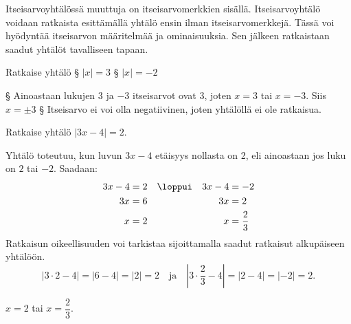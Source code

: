 
Itseisarvoyhtälössä muuttuja on itseisarvomerkkien sisällä. Itseisarvoyhtälö voidaan ratkaista esittämällä yhtälö ensin ilman itseisarvomerkkejä. Tässä voi hyödyntää itseisarvon määritelmää ja ominaisuuksia. Sen jälkeen ratkaistaan saadut yhtälöt tavalliseen tapaan.


\begin{esimerkki}
	Ratkaise yhtälö
	\alakohdat
		§  $|x|=3$
		§  $|x|=-2$
	\loppu
	\begin{esimratk}
		\alakohdat
			§ Ainoastaan lukujen $3$ ja $-3$ itseisarvot ovat 3, joten $x=3$ tai $x=-3$. Siis $x=\pm 3$
			§ Itseisarvo ei voi olla negatiivinen, joten yhtälöllä ei ole ratkaisua.
		\loppu
	\end{esimratk}
\end{esimerkki}

\begin{esimerkki}
	Ratkaise yhtälö $|3x-4|=2$.
	\begin{esimratk}
		Yhtälö toteutuu, kun luvun $3x-4$ etäisyys nollasta on 2, eli ainoastaan jos luku on $2$ tai $-2$. Saadaan:
		\begin{align*}
			3x-4 & =2 & & \loppui & 3x-4 & =-2 \\
			3x & =6 && & 3x & = 2 \\
			x & =2 && & x & =\frac{2}{3}
		\end{align*}
		Ratkaisun oikeellisuuden voi tarkistaa sijoittamalla saadut ratkaisut alkupäiseen yhtälöön.
		\[ |3\cdot2-4|=|6-4|=|2|=2 \quad \text{ja} \quad
			\left|3\cdot\frac{2}{3}-4\right|=|2-4|=|-2|=2. \]
	\end{esimratk}
	\begin{esimvast}
		$x=2$ tai $x=\dfrac{2}{3}$.
	\end{esimvast}
\end{esimerkki}

